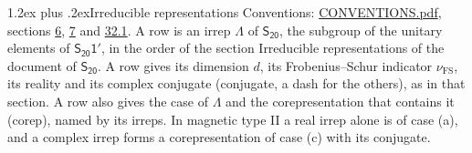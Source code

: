 \documentclass[10pt,a4paper]{article}
\makeatletter
\renewcommand\section{\@startsection{section}{1}{\z@}{-3ex plus -1ex minus -.2ex}%
  {1.2ex plus .2ex}{\normalfont\large\sffamily\bfseries\color{parttitle}}}
\numberwithin{equation}{section}
\newcommand{\grp}[1]{\mathsf{#1}}
\newcommand{\fsind}{\nu_{\mathrm{FS}}}
\makeatother
\begin{document}
\section{Irreducible representations}\label{s:irreps}
Conventions: \href{../../CONVENTIONS.pdf}{CONVENTIONS.pdf}, sections \href{../../../rotation/CONVENTIONS.pdf\#conv.6}{6}, \href{../../../rotation/CONVENTIONS.pdf\#conv.7}{7} and \href{../../CONVENTIONS.pdf\#conv.32.1}{32.1}.
\leavevmode\label{n:irrep.Delta}A row is an irrep $\Lambda$ of $\grp{S_{20}}$, the subgroup of the unitary elements of $\grp{S_{20}1'}$, in the order of the section Irreducible representations of the document of \href{../../../rotation/data/pdf/S20.pdf}{$\grp{S_{20}}$}. \label{n:index.dimension}\label{n:index.frobenius}\label{n:head.irrep}\label{n:head.reality}\label{n:head.conjugate}A row gives its dimension $d$, its Frobenius--Schur indicator $\fsind$, its reality and its complex conjugate (conjugate, a dash for the others), as in that section. \label{n:head.case.corep}\label{n:head.corep}A row also gives the case of $\Lambda$ and the corepresentation that contains it (corep), named by its irreps. In magnetic type II a real irrep alone is of case (a), and a complex irrep forms a corepresentation of case (c) with its conjugate.
\setlength{\emergencystretch}{2em}\par\setlength{\emergencystretch}{0pt}
\end{document}
